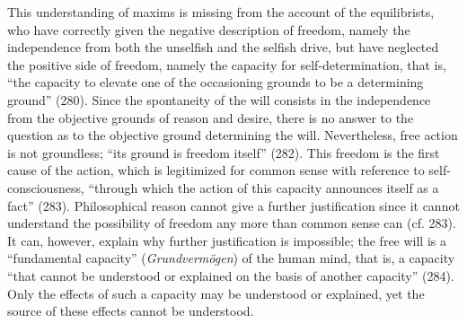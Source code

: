 This understanding of maxims is missing from the account of the equilibrists, who have correctly given the negative description of freedom, namely the independence from both the unselfish and the selfish drive, but have neglected the positive side of freedom, namely the capacity for self{-}determination, that is, ``the capacity to elevate one of the occasioning grounds to be a determining ground'' (280). Since the spontaneity of the will consists in the independence from the objective grounds of reason and desire, there is no answer to the question as to the objective ground determining the will. Nevertheless, free action is not groundless; ``its ground is freedom itself'' (282). This freedom is the first cause of the action, which is legitimized for common sense with reference to self{-}consciousness, ``through which the action of this capacity announces itself as a fact'' (283). Philosophical reason cannot give a further justification since it cannot understand the possibility of freedom any more than common sense can (cf. 283). It can, however, explain why further justification is impossible; the free will is a ``fundamental capacity'' (\textit{Grundverm\"{o}gen}) of the human mind, that is, a capacity ``that cannot be understood or explained on the basis of another capacity'' (284). Only the effects of such a capacity may be understood or explained, yet the source of these effects cannot be understood. 

